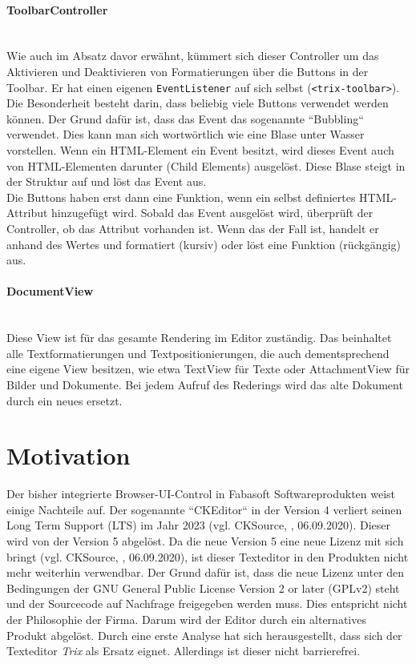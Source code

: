 \paragraph{ToolbarController}\mbox{}\\
Wie auch im Absatz davor erwähnt, kümmert sich dieser Controller um das Aktivieren und Deaktivieren von Formatierungen über die Buttons in der Toolbar. Er hat einen eigenen \texttt{EventListener} auf sich selbst (\texttt{<trix-toolbar>}). Die Besonderheit besteht darin, dass beliebig viele Buttons verwendet werden können. Der Grund dafür ist, dass das Event das sogenannte ``Bubbling`` verwendet. Dies kann man sich wortwörtlich wie eine Blase unter Wasser vorstellen. Wenn ein HTML-Element ein Event besitzt, wird dieses Event auch von HTML-Elementen darunter (Child Elements) ausgelöst. Diese Blase steigt in der Struktur auf und löst das Event aus.\\
Die Buttons haben erst dann eine Funktion, wenn ein selbst definiertes HTML-Attribut hinzugefügt wird. Sobald das Event ausgelöst wird, überprüft der Controller, ob das Attribut vorhanden ist. Wenn das der Fall ist, handelt er anhand des Wertes und formatiert (kursiv) oder löst eine Funktion (rückgängig) aus.

\paragraph{DocumentView}\mbox{}\\
Diese View ist für das gesamte Rendering im Editor zuständig. Das beinhaltet alle Textformatierungen und Textpositionierungen, die auch dementsprechend eine eigene View besitzen, wie etwa TextView für Texte oder AttachmentView für Bilder und Dokumente. Bei jedem Aufruf des Rederings wird das alte Dokument durch ein neues ersetzt.

\section{Motivation}
Der bisher integrierte Browser-UI-Control in Fabasoft Softwareprodukten weist einige Nachteile auf. Der sogenannte ``CKEditor`` in der Version 4 verliert seinen Long Term Support (LTS) im Jahr 2023 (vgl. CKSource, \cite{ckeditor_v4_2020}, 06.09.2020). Dieser wird von der Version 5 abgelöst. Da die neue Version 5 eine neue Lizenz mit sich bringt (vgl. CKSource, \cite{ckeditor_v5_2020}, 06.09.2020), ist dieser Texteditor in den Produkten nicht mehr weiterhin verwendbar. Der Grund dafür ist, dass die neue Lizenz unter den Bedingungen der GNU General Public License Version 2 or later (GPLv2) steht und der Sourcecode auf Nachfrage freigegeben werden muss. Dies entspricht nicht der Philosophie der Firma. Darum wird der Editor durch ein alternatives Produkt abgelöst. Durch eine erste Analyse hat sich herausgestellt, dass sich der Texteditor {\em{Trix}} als Ersatz eignet. Allerdings ist dieser nicht barrierefrei.

